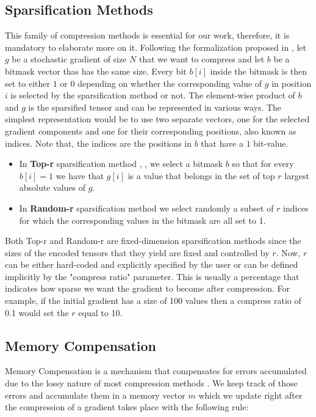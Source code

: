     \subsection{Sparsification Methods}
    This family of compression methods is essential for our work, therefore, it is mandatory to elaborate more on it.
    Following the formalization proposed in \cite{10754/662495},
    let $g$ be a stochastic gradient of size $N$ that we want to compress and let $b$ be a bitmask vector thas has the same size.
    Every bit $b[i]$ inside the bitmask is then set to either $1$ or $0$ depending on whether the corresponding value of $g$ in position $i$ is selected by the sparsification method or not.
    The element-wise product of $b$ and $g$ is the sparsified tensor and can be represented in various ways.
    The simplest representation would be to use two separate vectors, one for the selected gradient components and one for their corresponding positions, also known as indices. Note that, the indices are the positions in $b$ that have a $1$ bit-value.
    \begin{itemize}
        \item In {\bf Top-r} sparsification method \cite{Aji_2017}, \cite{alistarh2018convergence}, we select a bitmask $b$ so that for every $b[i]=1$ we have that $g[i]$ is a value that belongs in the set of top $r$ largest absolute values of $g$.
        
        \item In {\bf Random-r} sparsification method we select randomly a subset of $r$ indices for which the corresponding values in the bitmask are all set to 1.

    \end{itemize}
    Both Top-r and Random-r are fixed-dimension sparsification methods since the sizes of the encoded tensors that they yield are fixed and controlled by $r$.
    Now, $r$ can be either hard-coded and explicitly specified by the user or can be defined implicitly by the "compress ratio" parameter. This is usually a percentage that indicates how sparse we want the gradient to become after compression. For example, if the initial gradient has a size of 100 values then a compress ratio of 0.1 would set the $r$ equal to 10. 
    
    
    \subsection{Memory Compensation}
    Memory Compensation is a mechanism that compensates for errors accumulated due to the lossy nature of most compression methods \cite{stich2018sparsified}.
    We keep track of those errors and accumulate them in a memory vector $m$ which we update right after the compression of a gradient takes place with the following rule: 
    
